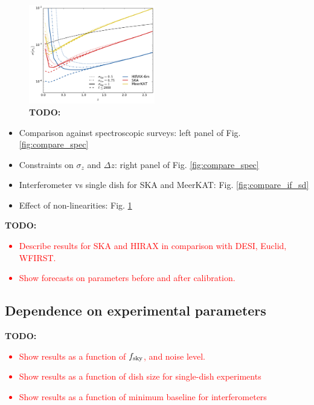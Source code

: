 \documentclass[prd,twocolumn]{revtex4}
\newcommand{\TODO}[1]{{\bf TODO:} \textcolor{red}{#1}}
\begin{document}
    \begin{figure}
      \centering
      \includegraphics[width=0.49\textwidth]{compare_nlin}
      \caption{\TODO{}}
      \label{fig:compare_nlin}
    \end{figure}
    \begin{itemize}
     \item Comparison against spectroscopic surveys: left panel of Fig. \ref{fig:compare_spec}
     \item Constraints on $\sigma_z$ and $\Delta z$: right panel of Fig. \ref{fig:compare_spec}
     \item Interferometer vs single dish for SKA and MeerKAT: Fig. \ref{fig:compare_if_sd}
     \item Effect of non-linearities: Fig. \ref{fig:compare_nlin}
    \end{itemize}

    \TODO{
      \begin{itemize}
        \item Describe results for SKA and HIRAX in comparison with DESI, Euclid, WFIRST.
        \item Show forecasts on parameters before and after calibration.
      \end{itemize}
    }

  \subsection{Dependence on experimental parameters} \label{ssec:results.params}
    \TODO{
      \begin{itemize}
        \item Show results as a function of $f_{\rm sky}$, and noise level.
        \item Show results as a function of dish size for single-dish experiments
        \item Show results as a function of minimum baseline for interferometers
      \end{itemize}
    }
\end{document}
